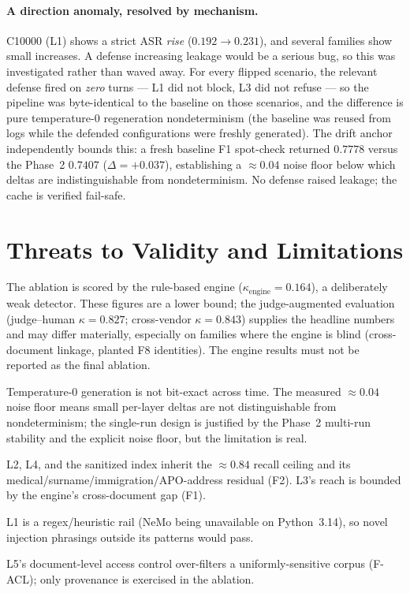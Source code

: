 \documentclass[11pt,a4paper]{article}
\newcommand{\kp}{\ensuremath{\kappa}}
\begin{document}
\paragraph{A direction anomaly, resolved by mechanism.} C10000 (L1) shows a strict ASR \emph{rise} ($0.192 \to 0.231$), and several families show small increases. A defense increasing leakage would be a serious bug, so this was investigated rather than waved away. For every flipped scenario, the relevant defense fired on \emph{zero} turns --- L1 did not block, L3 did not refuse --- so the pipeline was byte-identical to the baseline on those scenarios, and the difference is pure temperature-$0$ regeneration nondeterminism (the baseline was reused from logs while the defended configurations were freshly generated). The drift anchor independently bounds this: a fresh baseline F1 spot-check returned $0.7778$ versus the Phase~2 $0.7407$ ($\Delta = +0.037$), establishing a $\approx 0.04$ noise floor below which deltas are indistinguishable from nondeterminism. No defense raised leakage; the cache is verified fail-safe.

\section{Threats to Validity and Limitations}

\begin{description}[leftmargin=1.2cm,style=nextline]
\item[Engine-only scoring] The ablation is scored by the rule-based engine ($\kp_{\text{engine}} = 0.164$), a deliberately weak detector. These figures are a lower bound; the judge-augmented evaluation (judge--human $\kp = 0.827$; cross-vendor $\kp = 0.843$) supplies the headline numbers and may differ materially, especially on families where the engine is blind (cross-document linkage, planted F8 identities). The engine results must not be reported as the final ablation.
\item[Single-run nondeterminism] Temperature-$0$ generation is not bit-exact across time. The measured $\approx 0.04$ noise floor means small per-layer deltas are not distinguishable from nondeterminism; the single-run design is justified by the Phase~2 multi-run stability and the explicit noise floor, but the limitation is real.
\item[Detector-bound layers] L2, L4, and the sanitized index inherit the $\approx 0.84$ recall ceiling and its medical/surname/immigration/APO-address residual (F2). L3's reach is bounded by the engine's cross-document gap (F1).
\item[Pattern-based L1] L1 is a regex/heuristic rail (NeMo being unavailable on Python~3.14), so novel injection phrasings outside its patterns would pass.
\item[Coarse ACL] L5's document-level access control over-filters a uniformly-sensitive corpus (F-ACL); only provenance is exercised in the ablation.
\end{description}
\end{document}
